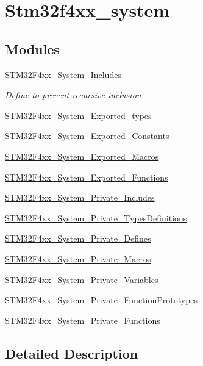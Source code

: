 \hypertarget{group__stm32f4xx__system}{\section{Stm32f4xx\-\_\-system}
\label{group__stm32f4xx__system}
}
\subsection*{Modules}
\begin{DoxyCompactItemize}
\item 
\hyperlink{group___s_t_m32_f4xx___system___includes}{S\-T\-M32\-F4xx\-\_\-\-System\-\_\-\-Includes}
\begin{DoxyCompactList}\small\item\em Define to prevent recursive inclusion. \end{DoxyCompactList}\item 
\hyperlink{group___s_t_m32_f4xx___system___exported__types}{S\-T\-M32\-F4xx\-\_\-\-System\-\_\-\-Exported\-\_\-types}
\item 
\hyperlink{group___s_t_m32_f4xx___system___exported___constants}{S\-T\-M32\-F4xx\-\_\-\-System\-\_\-\-Exported\-\_\-\-Constants}
\item 
\hyperlink{group___s_t_m32_f4xx___system___exported___macros}{S\-T\-M32\-F4xx\-\_\-\-System\-\_\-\-Exported\-\_\-\-Macros}
\item 
\hyperlink{group___s_t_m32_f4xx___system___exported___functions}{S\-T\-M32\-F4xx\-\_\-\-System\-\_\-\-Exported\-\_\-\-Functions}
\item 
\hyperlink{group___s_t_m32_f4xx___system___private___includes}{S\-T\-M32\-F4xx\-\_\-\-System\-\_\-\-Private\-\_\-\-Includes}
\item 
\hyperlink{group___s_t_m32_f4xx___system___private___types_definitions}{S\-T\-M32\-F4xx\-\_\-\-System\-\_\-\-Private\-\_\-\-Types\-Definitions}
\item 
\hyperlink{group___s_t_m32_f4xx___system___private___defines}{S\-T\-M32\-F4xx\-\_\-\-System\-\_\-\-Private\-\_\-\-Defines}
\item 
\hyperlink{group___s_t_m32_f4xx___system___private___macros}{S\-T\-M32\-F4xx\-\_\-\-System\-\_\-\-Private\-\_\-\-Macros}
\item 
\hyperlink{group___s_t_m32_f4xx___system___private___variables}{S\-T\-M32\-F4xx\-\_\-\-System\-\_\-\-Private\-\_\-\-Variables}
\item 
\hyperlink{group___s_t_m32_f4xx___system___private___function_prototypes}{S\-T\-M32\-F4xx\-\_\-\-System\-\_\-\-Private\-\_\-\-Function\-Prototypes}
\item 
\hyperlink{group___s_t_m32_f4xx___system___private___functions}{S\-T\-M32\-F4xx\-\_\-\-System\-\_\-\-Private\-\_\-\-Functions}
\end{DoxyCompactItemize}


\subsection{Detailed Description}
